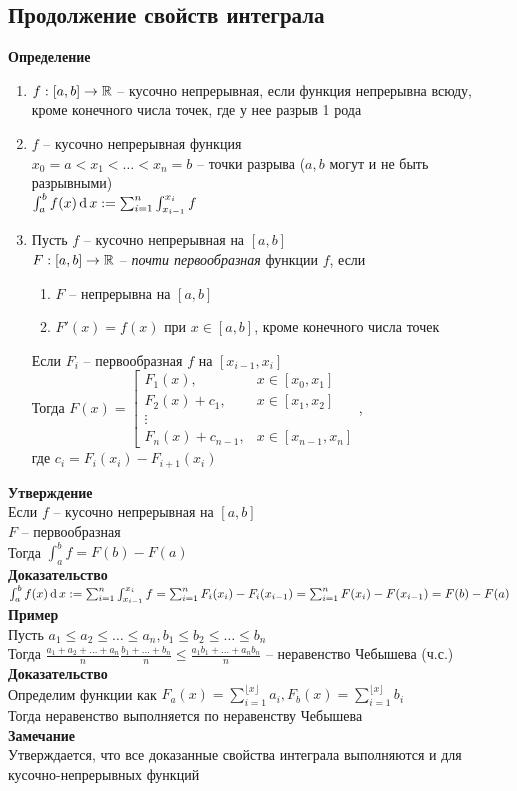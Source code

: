 \documentclass[12pt]{article}
\begin{document}
\subsection{Продолжение свойств интеграла}
\textbf{Определение}
\begin{enumerate}
    \item $f: [a,b] \rightarrow \mathbb{R}$ -- кусочно непрерывная, если функция непрерывна всюду, кроме конечного числа точек, где у нее разрыв 1 рода
    \item $f$ -- кусочно непрерывная функция\\
    $x_0 = a < x_1 < \ldots < x_n = b$ -- точки разрыва ($a,b$ могут и не быть разрывными)\\
    $\int_a^b f(x)\operatorname{d} x := \sum_{i=1}^n\int_{x_{i-1}}^{x_i} f$
    \item Пусть $f$ -- кусочно непрерывная на $[a,b]$\\
    $F:[a,b] \rightarrow \mathbb{R}$ -- \textit{почти первообразная} функции $f$, если
    \begin{enumerate}
        \item $F$ -- непрерывна на $[a,b]$
        \item $F'(x) = f(x)$ при $x \in [a,b]$, кроме конечного числа точек
    \end{enumerate}
    Если $F_i$ -- первообразная $f$ на $[x_{i-1}, x_i]$\\
    Тогда $F(x) = \left[\begin{array}{ll}
         F_1(x),& x \in [x_0, x_1]\\
         F_2(x) + c_1,& x \in [x_1, x_2]\\
         \vdots\\
         F_n(x) + c_{n-1}, & x\in [x_{n-1}, x_n]
    \end{array}\right.$,\\
    где $c_i = F_i(x_i) - F_{i+1}(x_i)$
\end{enumerate}
\textbf{Утверждение}\\
Если $f$ -- кусочно непрерывная на $[a,b]$\\
$F$ -- первообразная\\
Тогда $\int_a^b f = F(b) - F(a)$\\
\textbf{Доказательство}\\
$\int_a^b f(x)\operatorname{d} x := \sum_{i=1}^n\int_{x_{i-1}}^{x_i} f = \sum_{i=1}^n F_i(x_i) - F_i(x_{i-1}) = \sum_{i=1}^n F(x_i) - F(x_{i-1}) = F(b) - F(a)$\\
\textbf{Пример}\\
Пусть $a_1 \leq a_2 \leq \ldots \leq a_n, b_1 \leq b_2 \leq \ldots \leq b_n$\\
Тогда $\frac{a_1 + a_2 + \ldots + a_n}{n}\frac{b_1 + \ldots + b_n}{n} \leq \frac{a_1b_1 + \ldots + a_nb_n}{n}$ -- неравенство Чебышева (ч.с.)\\
\textbf{Доказательство}\\
Определим функции как $F_a(x) = \sum_{i=1}^{\lfloor x \rfloor} a_i, F_b(x) = \sum_{i=1}^{\lfloor x \rfloor} b_i$\\
Тогда неравенство выполняется по неравенству Чебышева\\
\textbf{Замечание}\\
Утверждается, что все доказанные свойства интеграла выполняются и для кусочно-непрерывных функций\\
\end{document}
